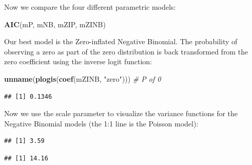\documentclass[12pt,]{book}
\newenvironment{Shaded}{\begin{snugshade}}{\end{snugshade}}
\newcommand{\CommentTok}[1]{\textcolor[rgb]{0.56,0.35,0.01}{\textit{#1}}}
\newcommand{\KeywordTok}[1]{\textcolor[rgb]{0.13,0.29,0.53}{\textbf{#1}}}
\newcommand{\NormalTok}[1]{#1}
\newcommand{\OperatorTok}[1]{\textcolor[rgb]{0.81,0.36,0.00}{\textbf{#1}}}
\newcommand{\StringTok}[1]{\textcolor[rgb]{0.31,0.60,0.02}{#1}}
\begin{document}
Now we compare the four different parametric models:

\begin{Shaded}
\begin{Highlighting}[]
\KeywordTok{AIC}\NormalTok{(mP, mNB, mZIP, mZINB)}
\end{Highlighting}
\end{Shaded}

Our best model is the Zero-inflated Negative Binomial.
The probability of observing a zero as part of the zero
distribution is back transformed from the zero coefficient
using the inverse logit function:

\begin{Shaded}
\begin{Highlighting}[]
\KeywordTok{unname}\NormalTok{(}\KeywordTok{plogis}\NormalTok{(}\KeywordTok{coef}\NormalTok{(mZINB, }\StringTok{"zero"}\NormalTok{))) }\CommentTok{# P of 0}
\end{Highlighting}
\end{Shaded}

\begin{verbatim}
## [1] 0.1346
\end{verbatim}

Now we use the scale parameter to visualize the variance functions
for the Negative Binomial models (the 1:1 line is the Poisson model):

\begin{Shaded}
\end{Shaded}

\begin{verbatim}
## [1] 3.59
\end{verbatim}

\begin{Shaded}
\end{Shaded}

\begin{verbatim}
## [1] 14.16
\end{verbatim}
\end{document}
